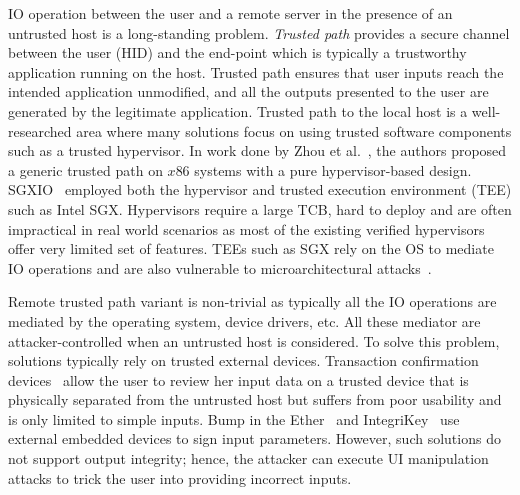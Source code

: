 IO operation between the user and a remote server in the presence of an untrusted host is a long-standing problem. \emph{Trusted path} provides a secure channel between the user (HID) and the end-point which is typically a trustworthy application running on the host. Trusted path ensures that user inputs reach the intended application unmodified, and all the outputs presented to the user are generated by the legitimate application. Trusted path to the local host is a well-researched area where many solutions focus on using trusted software components such as a trusted hypervisor. In work done by Zhou et al.~\cite{zhou2012building}, the authors proposed a generic trusted path on $x86$ systems with a pure hypervisor-based design. SGXIO~\cite{weiser2017sgxio} employed both the hypervisor and trusted execution environment (TEE) such as Intel SGX. Hypervisors require a large TCB, hard to deploy and are often impractical in real world scenarios as most of the existing verified hypervisors offer very limited set of features. TEEs such as SGX rely on the OS to mediate IO operations and are also vulnerable to microarchitectural attacks~\cite{van2018foreshadow}.

Remote trusted path variant is non-trivial as typically all the IO operations are mediated by the operating system, device drivers, etc. All these mediator are attacker-controlled when an  untrusted host is considered. To solve this problem, solutions typically rely on trusted external devices. Transaction confirmation devices~\cite{filyanov2011uni,weigold2011secure} allow the user to review her input data on a trusted device that is physically separated from the untrusted host but suffers from poor usability and is only limited to simple inputs. Bump in the Ether~\cite{McCPerRei2006} and IntegriKey~\cite{IntegriKey} use external embedded devices to sign input parameters. However, such solutions do not support output integrity; hence, the attacker can execute UI manipulation attacks to trick the user into providing incorrect inputs.

